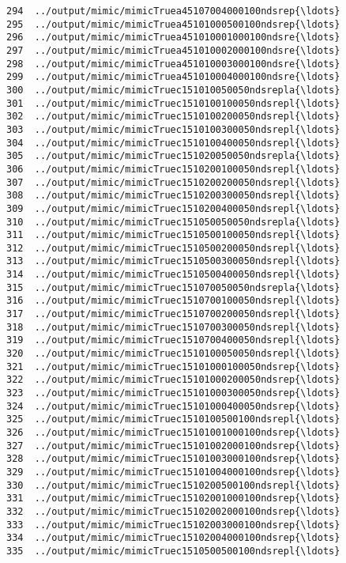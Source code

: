 \documentclass[11pt]{article}
\begin{document}
\begin{Verbatim}[commandchars=\\\{\}]
294  ../output/mimic/mimicTruea45107004000100ndsrep{\ldots}  
295  ../output/mimic/mimicTruea45101000500100ndsrep{\ldots}  
296  ../output/mimic/mimicTruea451010001000100ndsre{\ldots}  
297  ../output/mimic/mimicTruea451010002000100ndsre{\ldots}  
298  ../output/mimic/mimicTruea451010003000100ndsre{\ldots}  
299  ../output/mimic/mimicTruea451010004000100ndsre{\ldots}  
300  ../output/mimic/mimicTruec151010050050ndsrepla{\ldots}  
301  ../output/mimic/mimicTruec1510100100050ndsrepl{\ldots}  
302  ../output/mimic/mimicTruec1510100200050ndsrepl{\ldots}  
303  ../output/mimic/mimicTruec1510100300050ndsrepl{\ldots}  
304  ../output/mimic/mimicTruec1510100400050ndsrepl{\ldots}  
305  ../output/mimic/mimicTruec151020050050ndsrepla{\ldots}  
306  ../output/mimic/mimicTruec1510200100050ndsrepl{\ldots}  
307  ../output/mimic/mimicTruec1510200200050ndsrepl{\ldots}  
308  ../output/mimic/mimicTruec1510200300050ndsrepl{\ldots}  
309  ../output/mimic/mimicTruec1510200400050ndsrepl{\ldots}  
310  ../output/mimic/mimicTruec151050050050ndsrepla{\ldots}  
311  ../output/mimic/mimicTruec1510500100050ndsrepl{\ldots}  
312  ../output/mimic/mimicTruec1510500200050ndsrepl{\ldots}  
313  ../output/mimic/mimicTruec1510500300050ndsrepl{\ldots}  
314  ../output/mimic/mimicTruec1510500400050ndsrepl{\ldots}  
315  ../output/mimic/mimicTruec151070050050ndsrepla{\ldots}  
316  ../output/mimic/mimicTruec1510700100050ndsrepl{\ldots}  
317  ../output/mimic/mimicTruec1510700200050ndsrepl{\ldots}  
318  ../output/mimic/mimicTruec1510700300050ndsrepl{\ldots}  
319  ../output/mimic/mimicTruec1510700400050ndsrepl{\ldots}  
320  ../output/mimic/mimicTruec1510100050050ndsrepl{\ldots}  
321  ../output/mimic/mimicTruec15101000100050ndsrep{\ldots}  
322  ../output/mimic/mimicTruec15101000200050ndsrep{\ldots}  
323  ../output/mimic/mimicTruec15101000300050ndsrep{\ldots}  
324  ../output/mimic/mimicTruec15101000400050ndsrep{\ldots}  
325  ../output/mimic/mimicTruec1510100500100ndsrepl{\ldots}  
326  ../output/mimic/mimicTruec15101001000100ndsrep{\ldots}  
327  ../output/mimic/mimicTruec15101002000100ndsrep{\ldots}  
328  ../output/mimic/mimicTruec15101003000100ndsrep{\ldots}  
329  ../output/mimic/mimicTruec15101004000100ndsrep{\ldots}  
330  ../output/mimic/mimicTruec1510200500100ndsrepl{\ldots}  
331  ../output/mimic/mimicTruec15102001000100ndsrep{\ldots}  
332  ../output/mimic/mimicTruec15102002000100ndsrep{\ldots}  
333  ../output/mimic/mimicTruec15102003000100ndsrep{\ldots}  
334  ../output/mimic/mimicTruec15102004000100ndsrep{\ldots}  
335  ../output/mimic/mimicTruec1510500500100ndsrepl{\ldots}  

\end{Verbatim}
\end{document}
